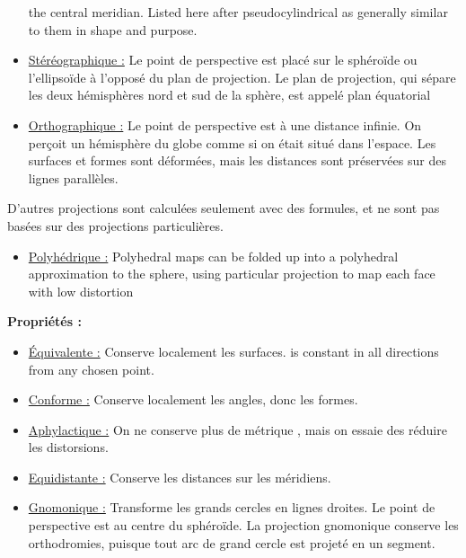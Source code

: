 \documentclass{article}
\begin{document}
\begin{itemize}
        the central meridian. Listed here after pseudocylindrical as generally 
        similar to them in 
        shape and purpose.
    \item \underline{Stéréographique :} \newline
    		Le point de perspective est placé sur le sphéroïde ou l'ellipsoïde à l'opposé du 
         plan de projection. Le plan de projection, qui sépare les deux hémisphères nord et sud de la sphère,
         est appelé plan équatorial
    \item \underline{Orthographique :} \newline
    		Le point de perspective est à une distance infinie. On perçoit un hémisphère du globe comme si on
    		était situé dans l'espace. Les surfaces et formes sont déformées, mais les distances sont préservées 
    		sur des lignes parallèles.
\end{itemize}

\vspace{1\baselineskip}

D'autres projections sont calculées seulement avec des formules, et ne sont pas basées sur des projections particulières.

\begin{itemize}
    \item \underline{Polyhédrique :} \newline
        Polyhedral maps can be folded up into a polyhedral approximation to the sphere, using 
        particular projection to map each 
        face with low distortion
\end{itemize}

\textbf{Propriétés :}

\begin{itemize}
    \item \underline{Équivalente :} \newline
        Conserve localement les surfaces.
        is constant in all directions from any chosen point.
    \item \underline{Conforme :} \newline
        Conserve localement les angles, donc les formes.
    \item \underline{Aphylactique :} \newline
        On ne conserve plus de métrique , mais on essaie des réduire les distorsions.
    \item \underline{Equidistante :} \newline
		Conserve les distances sur les méridiens.
    \item \underline{Gnomonique :} \newline
		Transforme les grands cercles en lignes droites.
		Le point de perspective est au centre du sphéroïde. La projection gnomonique conserve les orthodromies, puisque tout arc de grand cercle est projeté en un segment.
\end{itemize}
\end{document}

